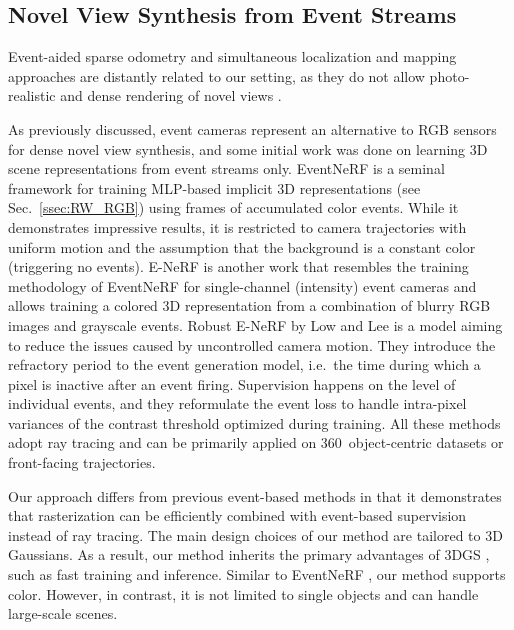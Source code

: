 \subsection{Novel View Synthesis from Event Streams}
Event-aided sparse odometry and simultaneous localization and mapping approaches are distantly related to our setting, as they do not allow photo-realistic and dense rendering of novel views \cite{Kim2016, Rebecq2017EVOAG, Hidalgo-Carrio_2022_CVPR, Klenk2024DeepEV}.

As previously discussed, event cameras represent an alternative to RGB sensors for dense novel view synthesis, and some initial work was done on learning 3D scene representations from event streams only. EventNeRF \cite{eventnerf} is a seminal framework for training MLP-based implicit 3D representations (see Sec.~\ref{ssec:RW_RGB}) using frames of accumulated color events.
While it demonstrates impressive results, it is restricted to camera trajectories with uniform motion and the assumption that the background is a constant color (triggering no events).
E-NeRF \cite{enerf} is another work that resembles the training methodology of EventNeRF for single-channel (intensity) event cameras and allows training a colored 3D representation from a combination of blurry RGB images and grayscale events. Robust E-NeRF by Low and Lee \cite{robust_enerf} is a model aiming to reduce the issues caused by uncontrolled camera motion. They introduce the refractory period to the event generation model, i.e.~the time during which a pixel is inactive after an event firing. Supervision happens on the level of individual events, and they reformulate the event loss to handle intra-pixel variances of the contrast threshold optimized during training. All these methods adopt ray tracing and can be primarily applied on 360\textdegree~object-centric  datasets or front-facing trajectories.

Our approach differs from previous event-based methods in that it demonstrates that rasterization can be efficiently combined with event-based supervision instead of ray tracing.
The main design choices of our method are tailored to 3D Gaussians. As a result, our method inherits the primary advantages of 3DGS \cite{3dgs}, such as fast training and inference. Similar to EventNeRF \cite{eventnerf}, our method supports color. However, in contrast, it is not limited to single objects and can handle large-scale scenes. 














